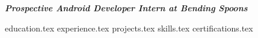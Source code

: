\documentclass[letterpaper,10pt]{article}
\begin{document}
\textbf{\emph{Prospective Android Developer Intern at Bending Spoons}}

{education.tex}
{experience.tex}
{projects.tex}
\sidebyside
    {{skills.tex}}
    {{certifications.tex}}
\end{document}
